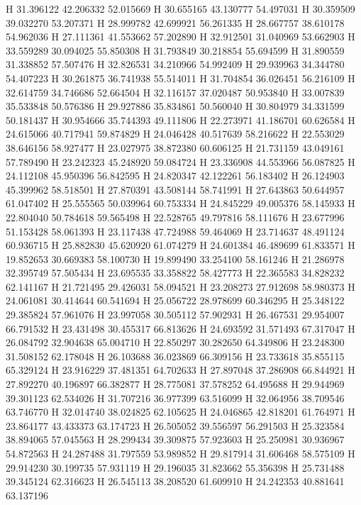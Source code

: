 \documentclass{article}
\begin{document}
H 31.396122 42.206332 52.015669
H 30.655165 43.130777 54.497031
H 30.359509 39.032270 53.207371
H 28.999782 42.699921 56.261335
H 28.667757 38.610178 54.962036
H 27.111361 41.553662 57.202890
H 32.912501 31.040969 53.662903
H 33.559289 30.094025 55.850308
H 31.793849 30.218854 55.694599
H 31.890559 31.338852 57.507476
H 32.826531 34.210966 54.992409
H 29.939963 34.344780 54.407223
H 30.261875 36.741938 55.514011
H 31.704854 36.026451 56.216109
H 32.614759 34.746686 52.664504
H 32.116157 37.020487 50.953840
H 33.007839 35.533848 50.576386
H 29.927886 35.834861 50.560040
H 30.804979 34.331599 50.181437
H 30.954666 35.744393 49.111806
H 22.273971 41.186701 60.626584
H 24.615066 40.717941 59.874829
H 24.046428 40.517639 58.216622
H 22.553029 38.646156 58.927477
H 23.027975 38.872380 60.606125
H 21.731159 43.049161 57.789490
H 23.242323 45.248920 59.084724
H 23.336908 44.553966 56.087825
H 24.112108 45.950396 56.842595
H 24.820347 42.122261 56.183402
H 26.124903 45.399962 58.518501
H 27.870391 43.508144 58.741991
H 27.643863 50.644957 61.047402
H 25.555565 50.039964 60.753334
H 24.845229 49.005376 58.145933
H 22.804040 50.784618 59.565498
H 22.528765 49.797816 58.111676
H 23.677996 51.153428 58.061393
H 23.117438 47.724988 59.464069
H 23.714637 48.491124 60.936715
H 25.882830 45.620920 61.074279
H 24.601384 46.489699 61.833571
H 19.852653 30.669383 58.100730
H 19.899490 33.254100 58.161246
H 21.286978 32.395749 57.505434
H 23.695535 33.358822 58.427773
H 22.365583 34.828232 62.141167
H 21.721495 29.426031 58.094521
H 23.208273 27.912698 58.980373
H 24.061081 30.414644 60.541694
H 25.056722 28.978699 60.346295
H 25.348122 29.385824 57.961076
H 23.997058 30.505112 57.902931
H 26.467531 29.954007 66.791532
H 23.431498 30.455317 66.813626
H 24.693592 31.571493 67.317047
H 26.084792 32.904638 65.004710
H 22.850297 30.282650 64.349806
H 23.248300 31.508152 62.178048
H 26.103688 36.023869 66.309156
H 23.733618 35.855115 65.329124
H 23.916229 37.481351 64.702633
H 27.897048 37.286908 66.844921
H 27.892270 40.196897 66.382877
H 28.775081 37.578252 64.495688
H 29.944969 39.301123 62.534026
H 31.707216 36.977399 63.516099
H 32.064956 38.709546 63.746770
H 32.014740 38.024825 62.105625
H 24.046865 42.818201 61.764971
H 23.864177 43.433373 63.174723
H 26.505052 39.556597 56.291503
H 25.323584 38.894065 57.045563
H 28.299434 39.309875 57.923603
H 25.250981 30.936967 54.872563
H 24.287488 31.797559 53.989852
H 29.817914 31.606468 58.575109
H 29.914230 30.199735 57.931119
H 29.196035 31.823662 55.356398
H 25.731488 39.345124 62.316623
H 26.545113 38.208520 61.609910
H 24.242353 40.881641 63.137196
\end{document}
